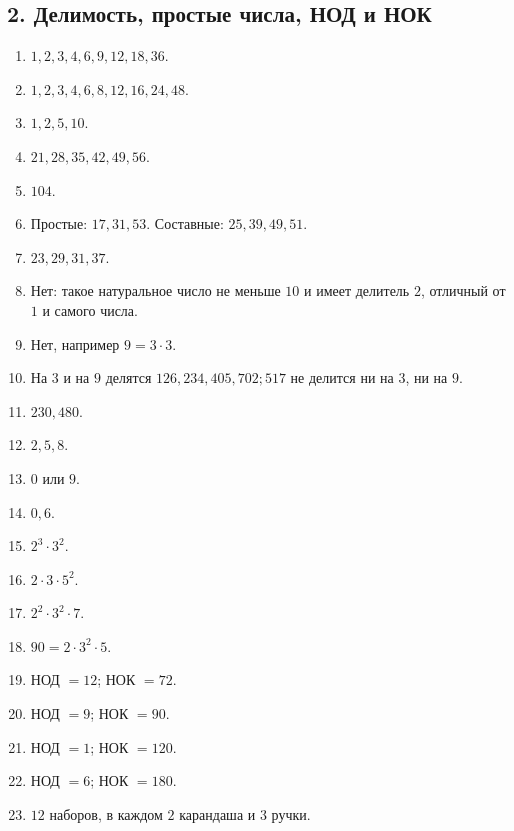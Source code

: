 \documentclass[12pt,a4paper]{article}
\theoremstyle{definition}
\theoremstyle{plain}
\theoremstyle{remark}
\begin{document}
\subsection*{2. Делимость, простые числа, НОД и НОК}
\begin{enumerate}[label=2.\arabic*.,leftmargin=2.8em,itemsep=5pt]
\item \(1,\allowbreak 2,\allowbreak 3,\allowbreak 4,\allowbreak 6,\allowbreak 9,\allowbreak 12,\allowbreak 18,\allowbreak 36\).
\item \(1,\allowbreak 2,\allowbreak 3,\allowbreak 4,\allowbreak 6,\allowbreak 8,\allowbreak 12,\allowbreak 16,\allowbreak 24,\allowbreak 48\).
\item \(1,\allowbreak 2,\allowbreak 5,\allowbreak 10\).
\item \(21,\allowbreak 28,\allowbreak 35,\allowbreak 42,\allowbreak 49,\allowbreak 56\).
\item \(104\).
\item Простые: \(17,\allowbreak 31,\allowbreak 53\). Составные: \(25,\allowbreak 39,\allowbreak 49,\allowbreak 51\).
\item \(23,\allowbreak 29,\allowbreak 31,\allowbreak 37\).
\item Нет: такое натуральное число не меньше \(10\) и имеет делитель \(2\), отличный от \(1\) и самого числа.
\item Нет, например \(9 = 3 \cdot  3\).
\item На \(3\) и на \(9\) делятся \(126,\allowbreak 234,\allowbreak 405,\allowbreak 702;\allowbreak 517\) не делится ни на \(3\), ни на \(9\).
\item \(230,\allowbreak 480\).
\item \(2,\allowbreak 5,\allowbreak 8\).
\item \(0\) или \(9\).
\item \(0,\allowbreak 6\).
\item \(2^{3} \cdot  3^{2}\).
\item \(2 \cdot  3 \cdot  5^{2}\).
\item \(2^{2} \cdot  3^{2} \cdot  7\).
\item \(90 = 2 \cdot  3^{2} \cdot  5\).
\item НОД \(= 12\); НОК \(= 72\).
\item НОД \(= 9\); НОК \(= 90\).
\item НОД \(= 1\); НОК \(= 120\).
\item НОД \(= 6\); НОК \(= 180\).
\item \(12\) наборов, в каждом \(2\) карандаша и \(3\) ручки.

\end{enumerate}
\end{document}
